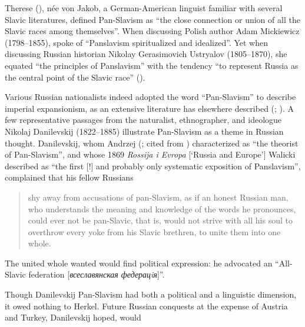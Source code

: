 \noindent Therese \citeauthor{robinson_historical_1850} (\citeyear[86]{robinson_historical_1850}), née von Jakob, a German-American linguist familiar with several Slavic literatures, defined Pan-Slavism as “the close connection or union of all the Slavic races among themselves”. When discussing Polish author Adam Mickiewicz (1798--1855), \citet[294]{robinson_historical_1850} spoke of “Panslavism spiritualized and idealized”. Yet when discussing Russian historian Nikolay Gerasimovich Ustryalov (1805--1870), she equated “the principles of Panslavism” with the tendency “to represent Russia as the central point of the Slavic race” (\citeyear[89]{robinson_historical_1850}).

Various Russian nationalists indeed adopted the word “Pan-Slavism” to describe imperial expansionism, as an extensive literature has elsewhere described (\cite{petrovich_emergence_1956}; \cite{fadner_seventy_1962}). A few representative passages from the naturalist, ethnographer, and ideologue Nikolaj Danilevskij (1822--1885) illustrate Pan-Slavism as a theme in Russian thought. Danilevskij, whom Andrzej \citeauthor{walicki_rosyjska_1973} (\citeyear{walicki_rosyjska_1973}; cited from \citeyear[291]{walicki_history_1979}) characterized as “the theorist of Pan-Slavism”, and whose 1869 \textit{Rossija i Evropa} [‘Russia and Europe’] Walicki described as “the first [!] and probably only systematic exposition of Panslavism”, complained that his fellow Russians

\begin{quote}
    shy away from accusations of pan-Slavism, as if an honest Russian man, who understands the meaning and knowledge of the words he pronounces, could ever not be pan-Slavic, that is, would not strive with all his soul to overthrow every yoke from his Slavic brethren, to unite them into one whole. \citep[311]{danilievskij_rossija_1871}
\end{quote}

\noindent The united whole \citet[387]{danilievskij_rossija_1871} wanted would find political expression: he advocated an “All-Slavic federation [\textit{всеславянская федерацiя}]”.

Though Danilevskij Pan-Slavism had both a political and a linguistic dimension, it owed nothing to Herkel. Future Russian conquests at the expense of Austria and Turkey, Danilevskij hoped, would

